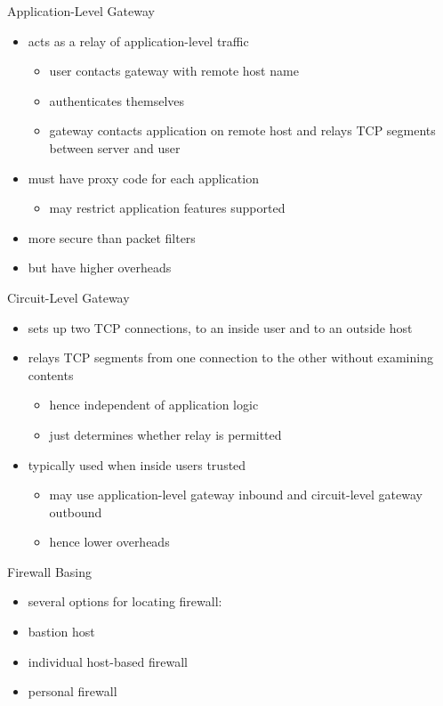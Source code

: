 \documentclass{beamer}
\begin{document}
\begin{frame}{Application-Level Gateway}
  \begin{itemize}
  \item acts as a relay of application-level traffic 
    \begin{itemize}
    \item user contacts gateway with remote host name 
    \item authenticates themselves 
    \item gateway contacts application on remote host and 
      relays TCP segments between server and user 
    \end{itemize}
  \item must have proxy code for each application 
    \begin{itemize}
    \item may restrict application features supported 
    \end{itemize}
  \item more secure than packet filters 
  \item but have higher overheads 
  \end{itemize}
\end{frame}

\begin{frame}{Circuit-Level Gateway}
  \begin{itemize}
  \item sets up two TCP connections, to an inside user 
    and to an outside host 
  \item relays TCP segments from one connection to 
    the other without examining contents 
    \begin{itemize}
    \item hence independent of application logic 
    \item just determines whether relay is permitted 
    \end{itemize}
  \item typically used when inside users trusted 
    \begin{itemize}
    \item may use application-level gateway inbound and 
      circuit-level gateway outbound 
    \item hence lower overheads
    \end{itemize}
  \end{itemize}
\end{frame}

\begin{frame}{Firewall Basing}
  \begin{itemize}
  \item several options for locating firewall: 
  \item bastion host 
  \item individual host-based firewall 
  \item personal firewall
  \end{itemize}
\end{frame}
\end{document}
